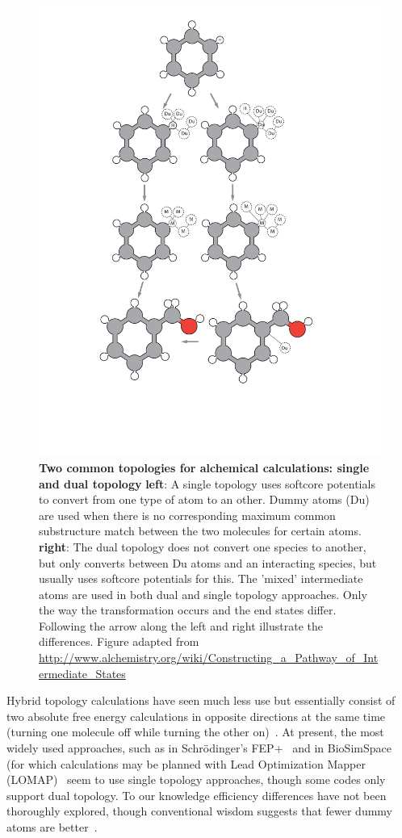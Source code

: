 \documentclass[9pt,bestpractices]{livecoms}
\begin{document}
\begin{figure}[h!]
    \includegraphics[width=0.95\columnwidth]{figures/fig3_topol/Figure.pdf}
    \caption{\textbf{Two common topologies for alchemical calculations: single and dual topology} \textbf{left}: A single topology uses softcore potentials to convert from one type of atom to an other. Dummy atoms (Du) are used when there is no corresponding maximum common substructure match between the two molecules for certain atoms. \textbf{right}: The dual topology does not convert one species to another, but only converts between Du atoms and an interacting species, but usually uses softcore potentials for this. The 'mixed' intermediate atoms are used in both dual and single topology approaches. Only the way the transformation occurs and the end states differ. Following the arrow along the left and right illustrate the differences.  Figure adapted from \url{http://www.alchemistry.org/wiki/Constructing_a_Pathway_of_Intermediate_States}}
    \label{fig:fig_topology}
\end{figure} 
Hybrid topology calculations have seen much less use but essentially consist of two absolute free energy calculations in opposite directions at the same time (turning one molecule off while turning the other on)~\cite{jiang2019computing}.
At present, the most widely used approaches, such as in Schr\"{o}dinger's FEP+~\cite{wang2015accurate,wang2019protein} and in BioSimSpace~\cite{hedges2019biosimspace} (for which calculations may be planned with Lead Optimization Mapper (LOMAP)~\cite{liu2013lead} seem to use single topology approaches, though some codes only support dual topology.
To our knowledge efficiency differences have not been thoroughly explored, though conventional wisdom suggests that fewer dummy atoms are better~\cite{liu2013lead,mobley2012perspective}.
%
\end{document}
